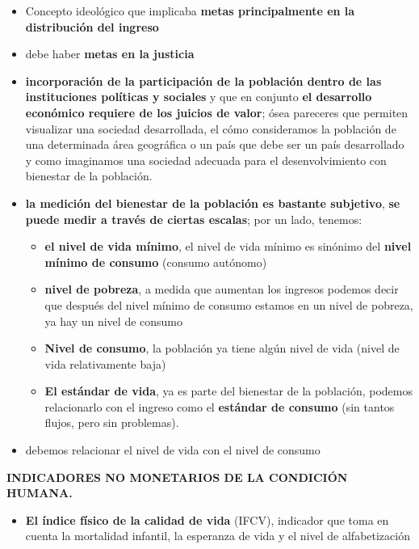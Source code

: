 \documentclass[
  letterpaper,
  DIV=11,
  numbers=noendperiod]{scrartcl}
\providecommand{\tightlist}{%
  \setlength{\itemsep}{0pt}\setlength{\parskip}{0pt}}\usepackage{longtable,booktabs,array}
\begin{document}
\begin{itemize}
\tightlist
\item
  Concepto ideológico que implicaba \textbf{metas principalmente en la
  distribución del ingreso}
\item
  debe haber \textbf{metas en la justicia}
\item
  \textbf{incorporación de la participación de la población dentro de
  las instituciones políticas y sociales} y que en conjunto \textbf{el
  desarrollo económico requiere de los juicios de valor}; ósea pareceres
  que permiten visualizar una sociedad desarrollada, el cómo
  consideramos la población de una determinada área geográfica o un país
  que debe ser un país desarrollado y como imaginamos una sociedad
  adecuada para el desenvolvimiento con bienestar de la población.
\item
  \textbf{la medición del bienestar de la población es bastante
  subjetivo}, \textbf{se puede medir a través de ciertas escalas}; por
  un lado, tenemos:

  \begin{itemize}
  \tightlist
  \item
    \textbf{el nivel de vida mínimo}, el nivel de vida mínimo es
    sinónimo del \textbf{nivel mínimo de consumo} (consumo autónomo)
  \item
    \textbf{nivel de pobreza}, a medida que aumentan los ingresos
    podemos decir que después del nivel mínimo de consumo estamos en un
    nivel de pobreza, ya hay un nivel de consumo
  \item
    \textbf{Nivel de consumo}, la población ya tiene algún nivel de vida
    (nivel de vida relativamente baja)
  \item
    \textbf{El estándar de vida}, ya es parte del bienestar de la
    población, podemos relacionarlo con el ingreso como el
    \textbf{estándar de consumo} (sin tantos flujos, pero sin
    problemas).
  \end{itemize}
\item
  debemos relacionar el nivel de vida con el nivel de consumo
\end{itemize}

\textbf{INDICADORES NO MONETARIOS DE LA CONDICIÓN HUMANA.}

\begin{itemize}
\tightlist
\item
  \textbf{El índice físico de la calidad de vida} (IFCV), indicador que
  toma en cuenta la mortalidad infantil, la esperanza de vida y el nivel
  de alfabetización
\end{itemize}
\end{document}

